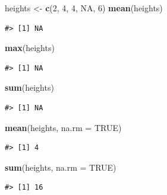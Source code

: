 \documentclass[]{book}
\newenvironment{Shaded}{\begin{snugshade}}{\end{snugshade}}
\newcommand{\KeywordTok}[1]{\textcolor[rgb]{0.13,0.29,0.53}{\textbf{#1}}}
\newcommand{\DataTypeTok}[1]{\textcolor[rgb]{0.13,0.29,0.53}{#1}}
\newcommand{\DecValTok}[1]{\textcolor[rgb]{0.00,0.00,0.81}{#1}}
\newcommand{\StringTok}[1]{\textcolor[rgb]{0.31,0.60,0.02}{#1}}
\newcommand{\OtherTok}[1]{\textcolor[rgb]{0.56,0.35,0.01}{#1}}
\newcommand{\NormalTok}[1]{#1}
\theoremstyle{definition}
\theoremstyle{definition}
\theoremstyle{remark}
\begin{document}
\begin{Shaded}
\begin{Highlighting}[]
\NormalTok{heights <-}\StringTok{ }\KeywordTok{c}\NormalTok{(}\DecValTok{2}\NormalTok{, }\DecValTok{4}\NormalTok{, }\DecValTok{4}\NormalTok{, }\OtherTok{NA}\NormalTok{, }\DecValTok{6}\NormalTok{)}
\KeywordTok{mean}\NormalTok{(heights)}
\end{Highlighting}
\end{Shaded}

\begin{verbatim}
#> [1] NA
\end{verbatim}

\begin{Shaded}
\begin{Highlighting}[]
\KeywordTok{max}\NormalTok{(heights)}
\end{Highlighting}
\end{Shaded}

\begin{verbatim}
#> [1] NA
\end{verbatim}

\begin{Shaded}
\begin{Highlighting}[]
\KeywordTok{sum}\NormalTok{(heights)}
\end{Highlighting}
\end{Shaded}

\begin{verbatim}
#> [1] NA
\end{verbatim}

\begin{Shaded}
\begin{Highlighting}[]
\KeywordTok{mean}\NormalTok{(heights, }\DataTypeTok{na.rm =} \OtherTok{TRUE}\NormalTok{)}
\end{Highlighting}
\end{Shaded}

\begin{verbatim}
#> [1] 4
\end{verbatim}

\begin{Shaded}
\begin{Highlighting}[]
\KeywordTok{sum}\NormalTok{(heights, }\DataTypeTok{na.rm =} \OtherTok{TRUE}\NormalTok{)}
\end{Highlighting}
\end{Shaded}

\begin{verbatim}
#> [1] 16
\end{verbatim}
\end{document}
